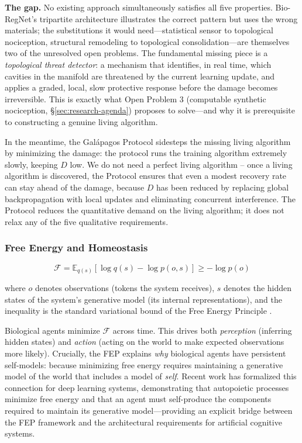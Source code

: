 \documentclass{article}
\begin{document}
\medskip
\noindent\textbf{The gap.} No existing approach simultaneously satisfies all five properties. Bio-RegNet's tripartite architecture illustrates the correct pattern but uses the wrong materials; the substitutions it would need---statistical sensor to topological nociception, structural remodeling to topological consolidation---are themselves two of the unresolved open problems. The fundamental missing piece is a \emph{topological threat detector}: a mechanism that identifies, in real time, which cavities in the manifold are threatened by the current learning update, and applies a graded, local, slow protective response before the damage becomes irreversible. This is exactly what Open Problem 3 (computable synthetic nociception, \S\ref{sec:research-agenda}) proposes to solve---and why it is prerequisite to constructing a genuine living algorithm.

In the meantime, the Galápagos Protocol sidesteps the missing living algorithm by minimizing the damage: the protocol runs the training algorithm extremely slowly, keeping $D$ low. We do not need a perfect living algorithm -- once a living algorithm is discovered, the Protocol ensures that even a modest recovery rate can stay ahead of the damage, because $D$ has been reduced by replacing global backpropagation with local updates and eliminating concurrent interference. The Protocol reduces the quantitative demand on the living algorithm; it does not relax any of the five qualitative requirements.


\subsubsection{Free Energy and Homeostasis}

\begin{equation}
\mathcal{F} = \mathbb{E}_{q(s)}[\log q(s) - \log p(o, s)] \geq -\log p(o)
\end{equation}

where $o$ denotes observations (tokens the system receives), $s$ denotes the hidden states of the system's generative model (its internal representations), and the inequality is the standard variational bound of the Free Energy Principle \citep{Friston2010freeenergy}.

Biological agents minimize $\mathcal{F}$ across time. This drives both \emph{perception} (inferring hidden states) and \emph{action} (acting on the world to make expected observations more likely). Crucially, the FEP explains \emph{why} biological agents have persistent self-models: because minimizing free energy requires maintaining a generative model of the world that includes a model of \emph{self}. Recent work \citep{Mazzaglia2022FEPdeep} has formalized this connection for deep learning systems, demonstrating that autopoietic processes minimize free energy and that an agent must self-produce the components required to maintain its generative model---providing an explicit bridge between the FEP framework and the architectural requirements for artificial cognitive systems.
\end{document}
